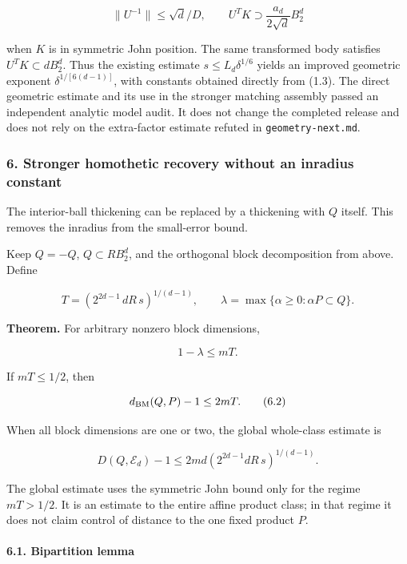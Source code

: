 \documentclass[
  11pt,
]{article}
\begin{document}
\[
 \|U^{-1}\|\le\sqrt d/D,\qquad
 U^TK\supset \frac{a_d}{2\sqrt d}B_2^d
\]

when \(K\) is in symmetric John position. The same transformed body
satisfies \(U^TK\subset dB_2^d\). Thus the existing estimate
\(s\le L_d\delta^{1/6}\) yields an improved geometric exponent
\(\delta^{1/[6(d-1)]}\), with constants obtained directly from (1.3).
The direct geometric estimate and its use in the stronger matching
assembly passed an independent analytic model audit. It does not change
the completed release and does not rely on the extra-factor estimate
refuted in \texttt{geometry-next.md}.

\subsubsection{6. Stronger homothetic recovery without an inradius
constant}\label{stronger-homothetic-recovery-without-an-inradius-constant}

The interior-ball thickening can be replaced by a thickening with \(Q\)
itself. This removes the inradius from the small-error bound.

Keep \(Q=-Q\), \(Q\subset RB_2^d\), and the orthogonal block
decomposition from above. Define

\[
T=\left(2^{2d-1}\,dR\,s\right)^{1/(d-1)},\qquad
\lambda=\max\{\alpha\ge0:\alpha P\subset Q\}.
\]

\textbf{Theorem.} For arbitrary nonzero block dimensions,

\[
\boxed{1-\lambda\le mT.}                              \tag{6.1}
\]

If \(mT\le1/2\), then

\[
d_{\rm BM}(Q,P)-1\le2mT.                              \tag{6.2}
\]

When all block dimensions are one or two, the global whole-class
estimate is

\[
\boxed{D(Q,\mathcal E_d)-1
       \le2md\left(2^{2d-1}dR\,s\right)^{1/(d-1)}.}    \tag{6.3}
\]

The global estimate uses the symmetric John bound only for the regime
\(mT>1/2\). It is an estimate to the entire affine product class; in
that regime it does not claim control of distance to the one fixed
product \(P\).

\paragraph{6.1. Bipartition lemma}\label{bipartition-lemma}
\end{document}
